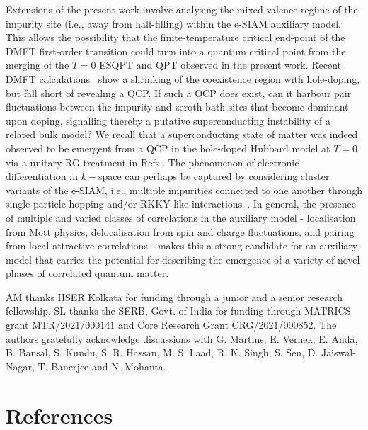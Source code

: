 \documentclass{iopart}
\begin{document}
Extensions of the present work involve analysing the mixed valence regime of the impurity site (i.e., away from half-filling) within the e-SIAM auxiliary model. This allows the possibility that the finite-temperature critical end-point of the DMFT first-order transition could turn into a quantum critical point from the merging of the $T=0$ ESQPT and QPT observed in the present work. Recent DMFT calculations~\cite{vucicevic2015} show a shrinking of the coexistence region with hole-doping, but fall short of revealing a QCP. If such a QCP does exist, can it harbour pair fluctuations between the impurity and zeroth bath sites that become dominant upon doping, signalling thereby a putative superconducting instability of a related bulk model? We recall that a superconducting state of matter was indeed observed to be emergent from a QCP in the hole-doped Hubbard model at $T=0$ via a unitary RG treatment in Refs.\cite{anirbanmott2,Mukherjee_mott_merg}.
The phenomenon of electronic differentiation in \(k-\)space can perhaps be captured by considering cluster variants of the e-SIAM, i.e., multiple impurities connected to one another through single-particle hopping and/or RKKY-like interactions~\cite{Ferrero2007,sakai_2009}.
In general, the presence of multiple and varied classes of correlations in the auxiliary model - localisation from Mott physics, delocalisation from spin and charge fluctuations, and pairing from local attractive correlations - makes this a strong candidate for an auxiliary model that carries the potential for describing the emergence of a variety of novel phases of correlated quantum matter.

\ack
AM thanks IISER Kolkata for funding through a junior and a senior research fellowship. SL thanks the SERB, Govt. of India for funding through MATRICS grant MTR/2021/000141 and Core Research Grant CRG/2021/000852. The authors gratefully acknowledge discussions with G. Martins, E. Vernek, E. Anda, B. Bansal, S. Kundu, S. R. Hassan, M. S. Laad, R. K. Singh, S. Sen, D. Jaiswal-Nagar, T. Banerjee and N. Mohanta.

\section*{References}


\end{document}
